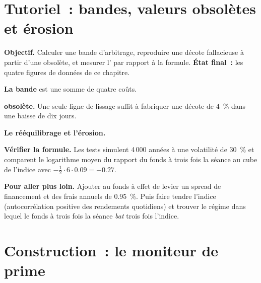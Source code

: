 \section{Tutoriel~: bandes, valeurs obsolètes et érosion}\label{tut:m1:exchange-traded-funds:bands}

\begin{tutorial}
\textbf{Objectif.} Calculer une bande d'arbitrage, reproduire une décote fallacieuse à partir
d'une  obsolète, et mesurer l' par rapport à la formule. \textbf{État
final~:} les quatre figures de données de ce chapitre.
\begin{tutsteps}
\item \textbf{La bande} est une somme de quatre coûts.
\label{lst:m1:exchange-traded-funds:band}
\item \textbf{ obsolète.} Une seule ligne de lissage suffit à fabriquer une décote
de 4~\% dans une baisse de dix jours.
\label{lst:m1:exchange-traded-funds:stale}
\item \textbf{Le rééquilibrage et l'érosion.}
\label{lst:m1:exchange-traded-funds:lev}
\item \textbf{Vérifier la formule.} Les tests simulent 4\,000 années à une volatilité de 30~\%
et comparent le logarithme moyen du rapport du fonds à trois fois la séance au cube de l'indice
avec $-\tfrac12\cdot6\cdot0.09 = -0.27$.
\end{tutsteps}
\textbf{Pour aller plus loin.} Ajouter au fonds à effet de levier un spread de financement et des frais annuels
de 0.95~\%. Puis faire tendre l'indice (autocorrélation positive des rendements
quotidiens) et trouver le régime dans lequel le fonds à trois fois la séance
\emph{bat} trois fois l'indice.
\end{tutorial}

\section{Construction~: le moniteur de prime}\label{bld:m1:exchange-traded-funds:monitor}

